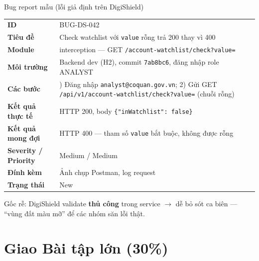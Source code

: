 \documentclass[aspectratio=169,12pt]{beamer}
\begin{document}
\begin{frame}{Bug report mẫu (lỗi giả định trên DigiShield)}
  \begin{center}
  \scriptsize
  \setlength{\tabcolsep}{4pt}
  \renewcommand{\arraystretch}{1.08}
  \begin{tabular}{>{\raggedright\arraybackslash}p{2.6cm}>{\raggedright\arraybackslash}p{9.4cm}}
    \toprule
    \textbf{ID} & BUG-DS-042 \\
    \textbf{Tiêu đề} & Check watchlist với \texttt{value} rỗng trả 200 thay vì 400 \\
    \textbf{Module} & interception --- GET \texttt{/account-watchlist/}\allowbreak\texttt{check?value=} \\
    \textbf{Môi trường} & Backend dev (H2), commit \texttt{7ab8bc6}, đăng nhập role ANALYST \\
    \textbf{Các bước} & 1) Đăng nhập \texttt{analyst@coquan.gov.vn}; 2) Gửi GET
      \texttt{/api/v1/account-watchlist/}\allowbreak\texttt{check?value=} (chuỗi rỗng) \\
    \textbf{Kết quả thực tế} & HTTP 200, body \texttt{\{"inWatchlist": false\}} \\
    \textbf{Kết quả mong đợi} & HTTP 400 --- tham số \texttt{value} bắt buộc, không được rỗng \\
    \textbf{Severity / Priority} & Medium / Medium \\
    \textbf{Đính kèm} & Ảnh chụp Postman, log request \\
    \textbf{Trạng thái} & New \\
    \bottomrule
  \end{tabular}
  \end{center}

  \vspace{0.1em}
  \small Gốc rễ: DigiShield validate \textbf{thủ công} trong service $\to$ dễ bỏ sót
  ca biên --- ``vùng đất màu mỡ'' để các nhóm săn lỗi thật.
\end{frame}

\section{Giao Bài tập lớn (30\%)}
\end{document}
